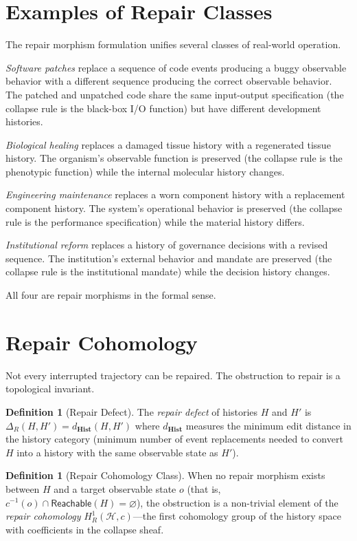 \documentclass[12pt, a4paper, openany]{book}
\theoremstyle{plain}
\theoremstyle{definition}
\newtheorem{definition}[theorem]{Definition}
\theoremstyle{remark}
\newcommand{\Hist}{\mathbf{Hist}}
\newcommand{\calH}{\mathcal{H}}
\begin{document}
\section{Examples of Repair Classes}

The repair morphism formulation unifies several classes of real-world operation.

\emph{Software patches} replace a sequence of code events producing a buggy
observable behavior with a different sequence producing the correct observable
behavior. The patched and unpatched code share the same input-output specification
(the collapse rule is the black-box I/O function) but have different development
histories.

\emph{Biological healing} replaces a damaged tissue history with a regenerated
tissue history. The organism's observable function is preserved (the collapse rule
is the phenotypic function) while the internal molecular history changes.

\emph{Engineering maintenance} replaces a worn component history with a replacement
component history. The system's operational behavior is preserved (the collapse
rule is the performance specification) while the material history differs.

\emph{Institutional reform} replaces a history of governance decisions with a
revised sequence. The institution's external behavior and mandate are preserved
(the collapse rule is the institutional mandate) while the decision history changes.

All four are repair morphisms in the formal sense.

\section{Repair Cohomology}

Not every interrupted trajectory can be repaired. The obstruction to repair is
a topological invariant.

\begin{definition}[Repair Defect]
The \emph{repair defect} of histories $H$ and $H'$ is
$\Delta_R(H, H') = d_{\Hist}(H, H')$ where $d_{\Hist}$ measures the minimum
edit distance in the history category (minimum number of event replacements
needed to convert $H$ into a history with the same observable state as $H'$).
\end{definition}

\begin{definition}[Repair Cohomology Class]
When no repair morphism exists between $H$ and a target observable state $o$
(that is, $c^{-1}(o) \cap \mathsf{Reachable}(H) = \varnothing$), the
obstruction is a non-trivial element of the \emph{repair cohomology}
$H^1_R(\calH, c)$---the first cohomology group of the history space with
coefficients in the collapse sheaf.
\end{definition}
\end{document}
